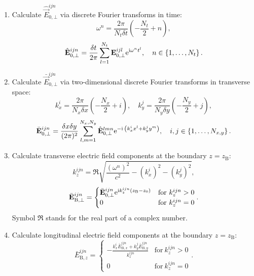 \begin{enumerate}
	\item Calculate $ \hat{\vec{E}}_{0, \bot}^{ijn} $ via discrete Fourier transforms in time:
	\begin{equation}
	\omega^n = \frac{2 \pi}{N_t \delta t} \left( -\frac{N_t}{2} + n \right),
	\end{equation}
	\begin{equation}
	\hat{\mathbf{E}}_{0, \bot}^{ijn} = \frac{\delta t}{2 \pi} \sum_{l=1}^{N_t} \mathbf{E}_{0, \bot}^{ijl} \mathrm{e}^{\mathrm{i} \omega^n t^l}, \quad n \in \left\lbrace 1, \dots, N_t \right\rbrace.
	\end{equation}
	\item Calculate $ \bar{\vec{E}}_{0, \bot}^{ijn} $ via two-dimensional discrete Fourier transforms in transverse space:
	\begin{equation}
	k_x^i = \frac{2 \pi}{N_x \delta x} \left( - \frac{N_x}{2} + i\right), \quad k_y^j = \frac{2 \pi}{N_y \delta y} \left( - \frac{N_y}{2} + j\right),
	\end{equation}
	\begin{equation}
	\bar{\mathbf{E}}_{0, \bot}^{ijn} = \frac{\delta x \delta y}{(2 \pi)^2} \sum_{l, m = 1}^{N_x, N_y} \hat{\mathbf{E}}_{0, \bot}^{lmn} \mathrm{e}^{- \mathrm{i} \: \left(k_x^i x^l + k_y^j y^m \right)}, \quad i, j \in \left\lbrace 1, \dots, N_{x, y} \right\rbrace.
	\end{equation}
	\item Calculate transverse electric field components at the boundary $ z = z_\mathrm{B} $:
	\begin{equation}
	k_z^{ijn} = \Re \sqrt{\frac{(\omega^n)^2}{c^2} - (k_x^i)^2 - (k_y^j)^2},
	\end{equation}
	\begin{equation}
	\bar{\mathbf{E}}_{\mathrm{B}, \bot}^{ijn} =
	\begin{cases} \bar{\mathbf{E}}_{0, \bot}^{ijn} \mathrm{e}^{\mathrm{i} k_z^{ijn}(z_\mathrm{B} - z_0)} & \text{for} \ k_z^{ijn} > 0 \\ 0 & \text{for} \ k_z^{ijn} = 0 \end{cases}.
	\end{equation}
	Symbol $ \Re $ stands for the real part of a complex number.
	\item Calculate longitudinal electric field components at the boundary $ z = z_\mathrm{B} $:
	\begin{equation}
	\bar{E}_{\mathrm{B}, z}^{ijn} = \begin{cases} -\frac{k_x^i \bar{E}_{\mathrm{B}, x}^{ijn} + k_y^j \bar{E}_{\mathrm{B}, y}^{ijn}}{k_z^{ijn}} & \text{for} \ k_z^{ijn} > 0 \\ 0 & \text{for} \ k_z^{ijn} = 0 \end{cases}.

\end{equation}
\end{enumerate}
